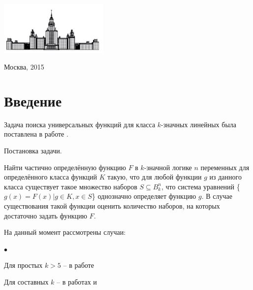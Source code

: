 \documentclass[oneside,final,14pt]{extreport}
\newenvironment{compactlist}{
    \begin{list}{{$\bullet$}}{
      \setlength\partopsep{0pt}
      \setlength\parskip{0pt}
      \setlength\parsep{0pt}
      \setlength\topsep{0pt}
      \setlength\itemsep{0pt}
} }{

 \end{list} 
}
\begin{document}
\begin{minipage}{0.45\textwidth}
\hfill             \\
{\bf \underline{ }\underline{ }\underline{ }\underline{ }\underline{ }\underline{ }\underline{ }\underline{ }\underline{ }\underline{ }\underline{ }\underline{ }\underline{ }\underline{ }\underline{ }\underline{ }\underline{ }\underline{ }\underline{ }\underline{ }\underline{ }\underline{ }}
\end{minipage}


\vfill

\centerline {\includegraphics[width=0.4\textwidth]{for_kurs}}

\vfill

\begin{center}
  Москва, 2015
\end{center}

\thispagestyle{empty}

\clearpage

\tableofcontents


  \chapter{Введение}

Задача поиска универсальных функций для класса \(k\)-значных линейных была поставлена в работе \cite{k_lin}.

Постановка задачи.

Найти частично определённую функцию \(F\) в \(k\)-значной логике \(n\) переменных 
для определённого класса функций \(K\) такую, что для любой функции \(g\) из данного класса существует такое
множество наборов \(S \subseteq B_k ^n\), что система уравнений \{\(g(x) = F(x) | g \in K, x \in S\)\} однозначно определяет
функцию \(g\). В случае существования такой функции оценить количество наборов, 
на которых достаточно задать функцию \(F\).

На данный момент рассмотрены случаи:
\begin{compactlist}
\item Для простых \(k > 5\) -- в работе \cite{k_lin} 
\item Для составных \(k\) -- в работах \cite{} и \cite{}
\end{compactlist}
\end{document}

